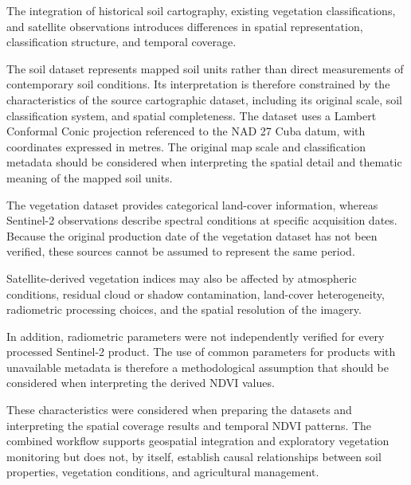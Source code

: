 The integration of historical soil cartography,
existing vegetation classifications, and
satellite observations introduces differences
in spatial representation, classification
structure, and temporal coverage.

The soil dataset represents mapped soil units
rather than direct measurements of contemporary
soil conditions. Its interpretation is therefore
constrained by the characteristics of the source
cartographic dataset, including its original
scale, soil classification system, and spatial
completeness. The dataset uses a Lambert
Conformal Conic projection referenced to the
NAD 27 Cuba datum, with coordinates expressed
in metres. The original map scale and
classification metadata should be considered
when interpreting the spatial detail and
thematic meaning of the mapped soil units.

The vegetation dataset provides categorical
land-cover information, whereas Sentinel-2
observations describe spectral conditions
at specific acquisition dates. Because the
original production date of the vegetation
dataset has not been verified, these sources
cannot be assumed to represent the same period.

Satellite-derived vegetation indices may also
be affected by atmospheric conditions, residual
cloud or shadow contamination, land-cover
heterogeneity, radiometric processing choices,
and the spatial resolution of the imagery.

In addition, radiometric parameters were not
independently verified for every processed
Sentinel-2 product. The use of common parameters
for products with unavailable metadata is
therefore a methodological assumption that
should be considered when interpreting the
derived NDVI values.

These characteristics were considered when
preparing the datasets and interpreting the
spatial coverage results and temporal NDVI
patterns. The combined workflow supports
geospatial integration and exploratory
vegetation monitoring but does not, by itself,
establish causal relationships between soil
properties, vegetation conditions, and
agricultural management.
